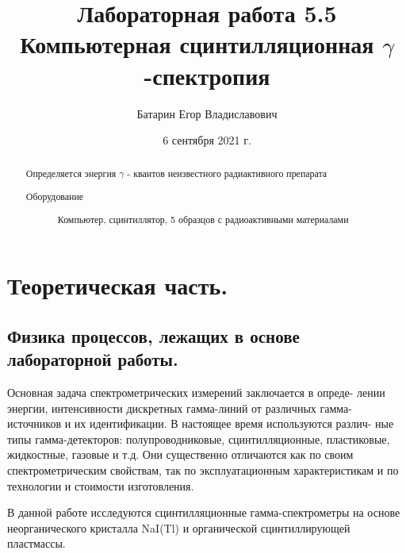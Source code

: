 \documentclass[%
 reprint,
 amsmath,amssymb,
 aps,
]{revtex4-2}
\begin{document}
\title{Лабораторная работа 5.5\\Компьютерная сцинтилляционная $\gamma$-спектропия}%



\author{Батарин Егор Владиславович}
%


\date{6 сентября 2021 г.}%
             

\begin{abstract}
Определяется энергия $\gamma$ - квантов неизвестного радиактивного препарата 
\begin{description}
\item[Оборудование]
Компьютер, сцинтиллятор, 5 образцов с радиоактивными материалами 
\end{description}
\end{abstract}

\maketitle


\section{Теоретическая часть.}
\subsection{Физика процессов, лежащих в основе лабораторной работы.}
	Основная задача спектрометрических измерений заключается в опреде-
лении энергии, интенсивности дискретных гамма-линий от различных гамма-
источников и их идентификации. В настоящее время используются различ-
ные типы гамма-детекторов: полупроводниковые, сцинтилляционные, пластиковые, жидкостные, газовые и т.д. Они существенно отличаются как по
своим спектрометрическим свойствам, так по эксплуатационным характеристикам и по технологии и стоимости изготовления.

В данной работе исследуются сцинтилляционные гамма-спектрометры на
основе неорганического кристалла NaI(Tl) и органической сцинтиллирующей
пластмассы.
\end{document}
